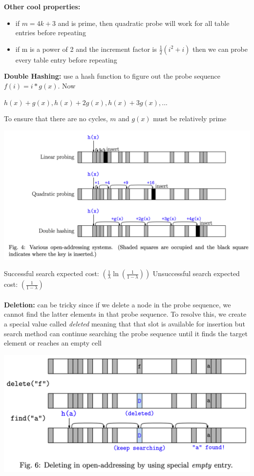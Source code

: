 \documentclass{article}
\begin{document}
  \textbf{Other cool properties:}
  \begin{itemize}[noitemsep]
    \item if $m = 4k + 3$ and is prime, then quadratic probe will work for all table entries before repeating
    \item if m is a power of 2 and the increment factor is $\frac{1}{2}(i^{2} + i)$ then we can probe every table entry before repeating \\
  \end{itemize}
  \textbf{Double Hashing: }use a hash function to figure out the probe sequence $f(i) = i*g(x)$. Now
  \begin{center} 
    $h(x) + g(x), h(x) + 2g(x), h(x) + 3g(x), ...$
  \end{center}
  To ensure that there are no cycles, $m$ and $g(x)$ must be relatively prime
  \begin{center}
  \includegraphics[scale=0.15]{HashProbe}
  \end{center}
  Successful search expected cost: $(\frac{1}{\lambda}\ln(\frac{1}{1 - \lambda}))$ \quad Unsuccessful search expected cost: $(\frac{1}{1 - \lambda})$ \\ \\
  \newpage
  \noindent \textbf{Deletion: }can be tricky since if we delete a node in the probe sequence, we cannot find the latter elements in that probe sequence. To resolve this, we create a special value called \textit{deleted} meaning that that slot is available for insertion but search method can continue searching the probe sequence until it finds the target element or reaches an empty cell
  \begin{center}
  \includegraphics[scale=0.15]{HashDeletion}
  \end{center}
\end{document}
